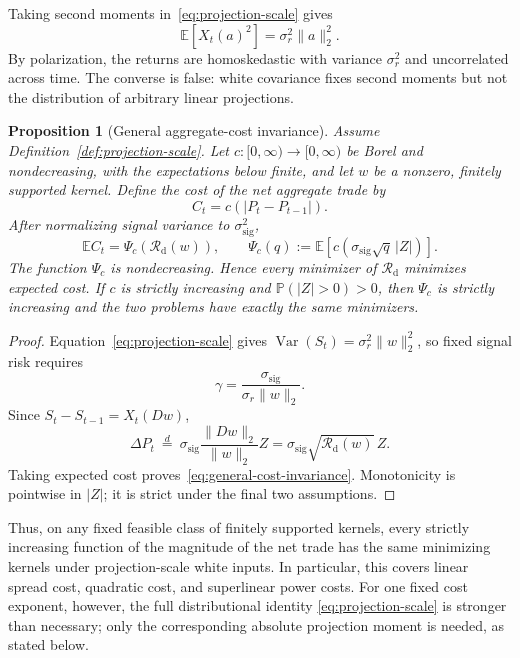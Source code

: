 \documentclass[11pt]{article}
\newtheorem{proposition}[theorem]{Proposition}
\theoremstyle{definition}
\theoremstyle{remark}
\newcommand{\Rcal}{\mathcal R}
\begin{document}
Taking second moments in~\eqref{eq:projection-scale} gives
\[
 \mathbb E[X_t(a)^2]=\sigma_r^2\|a\|_2^2.
\]
By polarization, the returns are homoskedastic with variance $\sigma_r^2$
and uncorrelated across time. The converse is false: white covariance fixes
second moments but not the distribution of arbitrary linear projections.

\begin{proposition}[General aggregate-cost invariance]
\label{prop:general-cost-invariance}
Assume Definition~\ref{def:projection-scale}. Let
$c:[0,\infty)\to[0,\infty)$ be Borel and nondecreasing, with the expectations
below finite, and let $w$ be a nonzero, finitely supported kernel. Define the
cost of the net aggregate trade by
\[
 C_t=c(|P_t-P_{t-1}|).
\]
After normalizing signal variance to $\sigma_{\mathrm{sig}}^2$,
\begin{equation}\label{eq:general-cost-invariance}
 \mathbb E C_t
 =\Psi_c\!\left(\Rcal_{\mathrm d}(w)\right),
 \qquad
 \Psi_c(q):=\mathbb E\!
 \left[c\!\left(\sigma_{\mathrm{sig}}\sqrt q\,|Z|\right)\right].
\end{equation}
The function $\Psi_c$ is nondecreasing. Hence every minimizer of
$\Rcal_{\mathrm d}$ minimizes expected cost. If $c$ is strictly increasing
and $\mathbb P(|Z|>0)>0$, then $\Psi_c$ is strictly increasing and the two
problems have exactly the same minimizers.
\end{proposition}
\begin{proof}
Equation~\eqref{eq:projection-scale} gives
$\operatorname{Var}(S_t)=\sigma_r^2\|w\|_2^2$, so fixed signal risk requires
\[
 \gamma=\frac{\sigma_{\mathrm{sig}}}{\sigma_r\|w\|_2}.
\]
Since $S_t-S_{t-1}=X_t(Dw)$,
\[
 \Delta P_t
 \ \overset d=\
 \sigma_{\mathrm{sig}}\frac{\|Dw\|_2}{\|w\|_2}Z
 =\sigma_{\mathrm{sig}}\sqrt{\Rcal_{\mathrm d}(w)}\,Z.
\]
Taking expected cost proves~\eqref{eq:general-cost-invariance}. Monotonicity
is pointwise in $|Z|$; it is strict under the final two assumptions.
\end{proof}

Thus, on any fixed feasible class of finitely supported kernels, every strictly increasing
function of the magnitude of the net trade has the same minimizing kernels
under projection-scale white inputs. In particular,
this covers linear spread cost, quadratic cost, and superlinear power costs.
For one fixed cost exponent, however, the full distributional identity
\eqref{eq:projection-scale} is stronger than necessary; only the corresponding
absolute projection moment is needed, as stated below.
\end{document}
